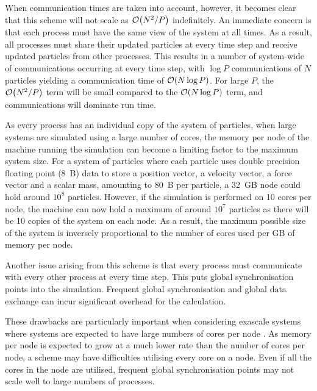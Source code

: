 %
When communication times are taken into account, however, it becomes
clear that this scheme will not scale as $\mathcal{O}{\left({ N^2/P }\right)}$ indefinitely.
%
An immediate concern is that each process must have the same view of the
system at all times.
%
As a result, all processes must share their updated particles at
every time step and receive updated particles from other processes.
%
This results in a number of system-wide of communications occurring
at every time step,
with $\log{P}$ communications of $N$ particles
yielding a communication time of $\mathcal{O}{\left({ N \log{P} }\right)}$.
%
For large $P$, the $\mathcal{O}{\left({ N^2/P }\right)}$ term will be small compared to the
$\mathcal{O}{\left({ N\log{P} }\right)}$ term, and communications will dominate run time.

As every process has an individual copy of the system of particles,
when large systems are simulated using a large number of cores,
the memory per node of the machine running the simulation
can become a limiting factor to the maximum system size.
%
For a system of particles where each particle uses double
precision floating point (8~B) data to store
a position vector,
a velocity vector,
a force vector and
a scalar mass,
amounting to 80~B per particle, a 32~GB node could hold around $10^8$
particles.
%
However, if the simulation is performed on 10 cores per node,
the machine can now hold a maximum of around $10^7$ particles
as there will be 10 copies of the system on each node.
%
As a result, the maximum possible size of the system is
inversely proportional to
the number of cores used per GB of memory per node.

Another issue arising from this scheme is
that every process must communicate with
every other process at every time step.
%
This puts global synchronisation points into the simulation.
%
Frequent global synchronisation and global data exchange can incur
significant overhead for the calculation.

%
These drawbacks are particularly important when considering exascale systems
where systems are expected to have large numbers of cores per node
\cite{dongarra2011international}.
%
As memory per node is expected to grow at a much lower rate than
the number of cores per node,
a \replicateddata{} scheme may have difficulties
utilising every core on a node.
%
Even if all the cores in the node are utilised, frequent global synchronisation
points may not scale well to large numbers of processes.

